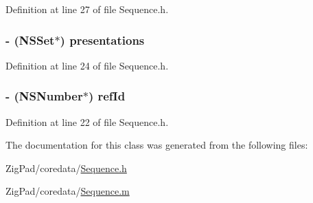 Definition at line 27 of file Sequence.h.

\hypertarget{interface_sequence_a65e57b3bfdc709fe646a438154e98d56}{
\subsubsection[{presentations}]{\setlength{\rightskip}{0pt plus 5cm}-\/ (NSSet$\ast$) presentations}}
\label{interface_sequence_a65e57b3bfdc709fe646a438154e98d56}


Definition at line 24 of file Sequence.h.

\hypertarget{interface_sequence_ae24e2568d0d3a40bebefe304cb92656c}{
\subsubsection[{refId}]{\setlength{\rightskip}{0pt plus 5cm}-\/ (NSNumber$\ast$) refId}}
\label{interface_sequence_ae24e2568d0d3a40bebefe304cb92656c}


Definition at line 22 of file Sequence.h.



The documentation for this class was generated from the following files:\begin{DoxyCompactItemize}
\item 
ZigPad/coredata/\hyperlink{_sequence_8h}{Sequence.h}\item 
ZigPad/coredata/\hyperlink{_sequence_8m}{Sequence.m}\end{DoxyCompactItemize}
